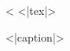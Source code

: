\begin{figure}[h!]
    \centering
    <%
    <|tex|>
    \caption{<|caption|>}
    \label{<|name|>}
\end{figure}
